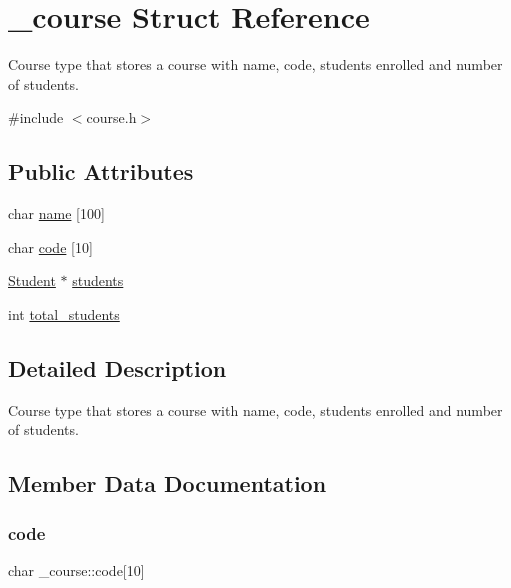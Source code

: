 \hypertarget{struct__course}{}\section{\+\_\+course Struct Reference}
\label{struct__course}


Course type that stores a course with name, code, students enrolled and number of students.  




{\ttfamily \#include $<$course.\+h$>$}

\subsection*{Public Attributes}
\begin{DoxyCompactItemize}
\item 
char \mbox{\hyperlink{struct__course_a8a6f7d2171f18b5d13e86913345f381d}{name}} \mbox{[}100\mbox{]}
\item 
char \mbox{\hyperlink{struct__course_ae86dc46bc4dfe126555e5560860b583f}{code}} \mbox{[}10\mbox{]}
\item 
\mbox{\hyperlink{student_8h_abcfb362c0eb3182c835992cf3d0c0dd3}{Student}} $\ast$ \mbox{\hyperlink{struct__course_a5cf448bc80f0f8c5f23402db23d41a00}{students}}
\item 
int \mbox{\hyperlink{struct__course_afd5e161f7cf358c13cc8aa868b462006}{total\+\_\+students}}
\end{DoxyCompactItemize}


\subsection{Detailed Description}
Course type that stores a course with name, code, students enrolled and number of students. 

\subsection{Member Data Documentation}
\mbox{\label{struct__course_ae86dc46bc4dfe126555e5560860b583f}} 
\subsubsection{\texorpdfstring{code}{code}}
{\footnotesize\ttfamily char \+\_\+course\+::code\mbox{[}10\mbox{]}}

